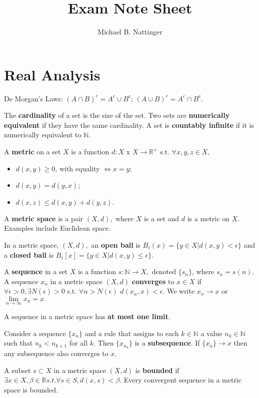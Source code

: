 \documentclass[11pt]{article} %
\title{Exam Note Sheet}
\author{Michael B. Nattinger}
\begin{document}
\maketitle

\section{Real Analysis}
De Morgan's Laws: $(A \cap B)^c = A^c \cup B^c$; $(A \cup B)^c = A^c \cap B^c$.

The \textbf{cardinality} of a set is the size of the set. Two sets are \textbf{numerically equivalent} if they have the same cardinality. A set is \textbf{countably infinite} if it is numerically equivalent to $\mathbb{N}$.

A \textbf{metric} on a set $X$ is a function $d: X $ x $ X \rightarrow \mathbb{R}^+$ s.t. $\forall x,y,z \in X,$
\begin{itemize}
\item $d(x,y) \geq 0$, with equality $\iff x = y;$
\item $d(x,y) = d(y,x)$;
\item $d(x,z) \leq d(x,y) + d(y,z).$
\end{itemize}
A \textbf{metric space} is a pair $(X,d),$ where $X$ is a set and $d$ is a metric on $X$. Examples include Euclidean space.

In a metric space, $(X,d),$ an \textbf{open ball} is $B_\epsilon(x) = \{ y \in X| d(x,y) < \epsilon\}$ and a \textbf{closed ball} is $B_\epsilon[x] = \{ y \in X| d(x,y) \leq \epsilon\}$.

A \textbf{sequence} in a set $X$ is a function $s: \mathbb{N} \rightarrow X,$ denoted $\{ s_n\}$, where $s_n = s(n)$. A sequence $x_n$ in a metric space $(X,d)$ \textbf{converges} to $x \in X$ if $\forall \epsilon >0, \exists N(\epsilon)>0$ s.t. $\forall n>N(\epsilon)$ $d(x_n,x) < \epsilon.$ We write $x_n \rightarrow x$ or $\lim\limits_{n \rightarrow \infty} x_n = x.$

A sequence in a metric space has \textbf{at most one limit}.

Consider a sequence $\{ x_n\}$ and a rule that assigns to each $k \in \mathbb{N}$ a value $n_k \in \mathbb{N}$ such that $n_k <n_{k+1}$ for all $k$. Then $\{ x_{n_k}\}$ is a \textbf{subsequence}. If $\{x_n\} \rightarrow x$ then any subsequence also converges to $x$.

A subset $s \subset X$ in a metric space $(X,d)$ is \textbf{bounded} if $\exists x \in X, \beta \in \mathbb{R} s.t. \forall s \in S, d(x,s) < \beta.$ Every convergent sequence in a metric space is bounded.
\end{document}
